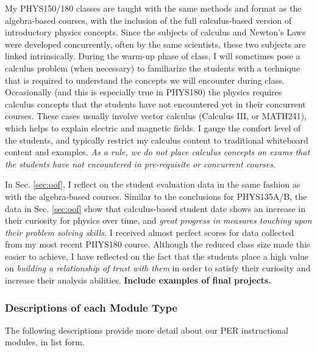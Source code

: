 \documentclass[../../../main.tex]{subfiles}
\begin{document}
My PHYS150/180 classes are taught with the same methods and format as the algebra-based courses, with the inclusion of the full calculus-based version of introductory physics concepts.  Since the subjects of calculus and Newton's Laws were developed concurrently, often by the same scientists, these two subjects are linked intrinsically.  During the warm-up phase of class, I will sometimes pose a calculus problem (when necessary) to familiarize the students with a technique that is required to understand the concepts we will encounter during class.  Occasionally (and this is especially true in PHYS180) the physics requires calculus concepts that the students have not encountered yet in their concurrent courses.  These cases usually involve vector calculus (Calculus III, or MATH241), which helps to explain electric and magnetic fields.  I gauge the comfort level of the students, and typically restrict my calculus content to traditional whiteboard content and examples.  \textit{As a rule, we do not place calculus concepts on exams that the students have not encountered in pre-requisite or concurrent courses}.  \\ \hspace{0.1cm}

In Sec. \ref{sec:oof}, I reflect on the student evaluation data in the same fashion as with the algebra-based courses.  Similar to the conclusions for PHYS135A/B, the data in Sec. \ref{sec:oof} show that calculus-based student date shows an increase in their curiosity for physics over time, and \textit{great progress in measures touching upon their problem solving skills.}  I received almost perfect scores for data collected from my most recent PHYS180 course.  Although the reduced class size made this easier to achieve, I have reflected on the fact that the students place a high value on \textit{building a relationship of trust with them} in order to satisfy their curiosity and increase their analysis abilities. \textbf{Include examples of final projects.} %

\subsubsection{Descriptions of each Module Type}
\label{sec:moduleType}

The following descriptions provide more detail about our PER instructional modules, in list form.
\end{document}
